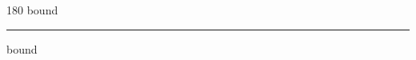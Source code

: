 
\begin{frame}
\begin{center}
\begin{turn}{180}
{\fontsize{2.5cm}{1em}\selectfont bound}
\end{turn}
\vspace{1em}\par  
\hrule
\vspace{1em}\par  
{\fontsize{2.5cm}{1em}\selectfont bound}
\end{center}
\end{frame}
